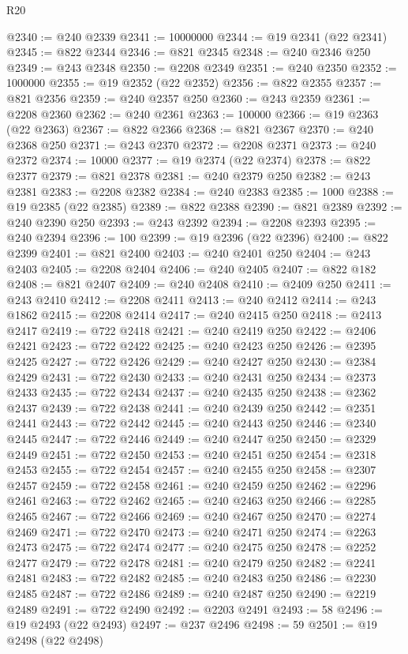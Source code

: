 \begin{lexlean}{R20}
\begin{coremodule}
{@2340 := @240 @2339
@2341 := 10000000
@2344 := @19 @2341 (@22 @2341)
@2345 := @822 @2344
@2346 := @821 @2345
@2348 := @240 @2346 @250
@2349 := @243 @2348
@2350 := @2208 @2349
@2351 := @240 @2350
@2352 := 1000000
@2355 := @19 @2352 (@22 @2352)
@2356 := @822 @2355
@2357 := @821 @2356
@2359 := @240 @2357 @250
@2360 := @243 @2359
@2361 := @2208 @2360
@2362 := @240 @2361
@2363 := 100000
@2366 := @19 @2363 (@22 @2363)
@2367 := @822 @2366
@2368 := @821 @2367
@2370 := @240 @2368 @250
@2371 := @243 @2370
@2372 := @2208 @2371
@2373 := @240 @2372
@2374 := 10000
@2377 := @19 @2374 (@22 @2374)
@2378 := @822 @2377
@2379 := @821 @2378
@2381 := @240 @2379 @250
@2382 := @243 @2381
@2383 := @2208 @2382
@2384 := @240 @2383
@2385 := 1000
@2388 := @19 @2385 (@22 @2385)
@2389 := @822 @2388
@2390 := @821 @2389
@2392 := @240 @2390 @250
@2393 := @243 @2392
@2394 := @2208 @2393
@2395 := @240 @2394
@2396 := 100
@2399 := @19 @2396 (@22 @2396)
@2400 := @822 @2399
@2401 := @821 @2400
@2403 := @240 @2401 @250
@2404 := @243 @2403
@2405 := @2208 @2404
@2406 := @240 @2405
@2407 := @822 @182
@2408 := @821 @2407
@2409 := @240 @2408
@2410 := @2409 @250
@2411 := @243 @2410
@2412 := @2208 @2411
@2413 := @240 @2412
@2414 := @243 @1862
@2415 := @2208 @2414
@2417 := @240 @2415 @250
@2418 := @2413 @2417
@2419 := @722 @2418
@2421 := @240 @2419 @250
@2422 := @2406 @2421
@2423 := @722 @2422
@2425 := @240 @2423 @250
@2426 := @2395 @2425
@2427 := @722 @2426
@2429 := @240 @2427 @250
@2430 := @2384 @2429
@2431 := @722 @2430
@2433 := @240 @2431 @250
@2434 := @2373 @2433
@2435 := @722 @2434
@2437 := @240 @2435 @250
@2438 := @2362 @2437
@2439 := @722 @2438
@2441 := @240 @2439 @250
@2442 := @2351 @2441
@2443 := @722 @2442
@2445 := @240 @2443 @250
@2446 := @2340 @2445
@2447 := @722 @2446
@2449 := @240 @2447 @250
@2450 := @2329 @2449
@2451 := @722 @2450
@2453 := @240 @2451 @250
@2454 := @2318 @2453
@2455 := @722 @2454
@2457 := @240 @2455 @250
@2458 := @2307 @2457
@2459 := @722 @2458
@2461 := @240 @2459 @250
@2462 := @2296 @2461
@2463 := @722 @2462
@2465 := @240 @2463 @250
@2466 := @2285 @2465
@2467 := @722 @2466
@2469 := @240 @2467 @250
@2470 := @2274 @2469
@2471 := @722 @2470
@2473 := @240 @2471 @250
@2474 := @2263 @2473
@2475 := @722 @2474
@2477 := @240 @2475 @250
@2478 := @2252 @2477
@2479 := @722 @2478
@2481 := @240 @2479 @250
@2482 := @2241 @2481
@2483 := @722 @2482
@2485 := @240 @2483 @250
@2486 := @2230 @2485
@2487 := @722 @2486
@2489 := @240 @2487 @250
@2490 := @2219 @2489
@2491 := @722 @2490
@2492 := @2203 @2491
@2493 := 58
@2496 := @19 @2493 (@22 @2493)
@2497 := @237 @2496
@2498 := 59
@2501 := @19 @2498 (@22 @2498)
}
\end{coremodule}
\end{lexlean}
